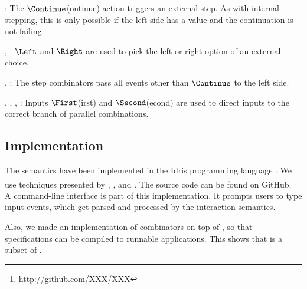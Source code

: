 :
The $\Continue$(ontinue) action triggers an external step.
As with internal stepping, this is only possible if the left side has a value and the continuation is not failing.

,
:
$\Left$ and $\Right$ are used to pick the left or right option of an external choice.

,
:
The step combinators pass all events other than $\Continue$ to the left side.

,
,
,
:
Inputs $\First$(irst) and $\Second$(econd) are used to direct inputs to the correct branch of parallel combinations.



\subsection{Implementation}

The semantics have been implemented in the Idris programming language \cite{journals/jfp/Brady13}.
We use techniques presented by \textcite{journals/entcs/JaskelioffGH11}, \textcite{journals/jfp/Swierstra08}, and \textcite{school/maktoberdorf/PeytonJones01}.
The source code can be found on GitHub.\footnote{\url{http://github.com/XXX/XXX}}
A command-line interface is part of this implementation.
It prompts users to type input events, which get parsed and processed by the interaction semantics.

Also, we made an implementation of \TOPHAT combinators on top of \ITASKS,
so that \TOPHAT specifications can be compiled to runnable applications.
This shows that \TOPHAT is a subset of \ITASKS.
